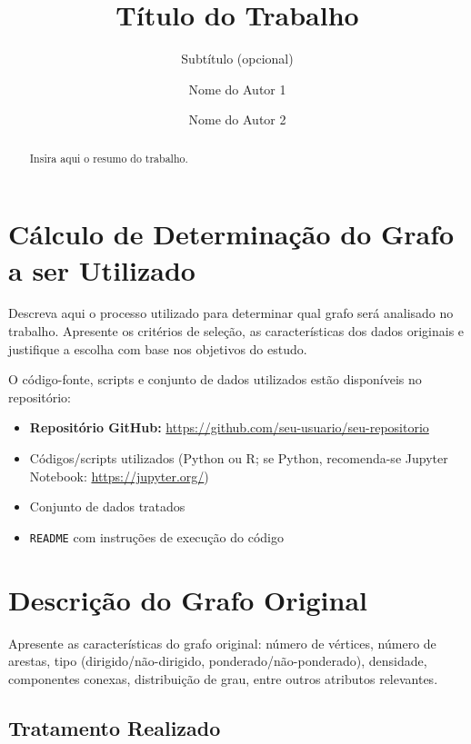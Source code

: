 \documentclass[sigconf]{webmedia}
\author{Nome do Autor 1}
\affiliation{%
  \institution{Nome da Instituição}
  \city{Cidade}
  \state{}
  \country{Brasil}
}
\author{Nome do Autor 2}
\affiliation{%
  \institution{Nome da Instituição}
  \city{Cidade}
  \state{}
  \country{Brasil}
}
\title{Título do Trabalho}
\subtitle{Subtítulo (opcional)}
\providecommand{\tightlist}{%
  \setlength{\itemsep}{0pt}\setlength{\parskip}{0pt}}
\begin{document}
\maketitle

\begin{abstract}
Insira aqui o resumo do trabalho.
\end{abstract}



\section{Cálculo de Determinação do Grafo a ser
Utilizado}\label{cuxe1lculo-de-determinauxe7uxe3o-do-grafo-a-ser-utilizado}

Descreva aqui o processo utilizado para determinar qual grafo será
analisado no trabalho. Apresente os critérios de seleção, as
características dos dados originais e justifique a escolha com base nos
objetivos do estudo.

O código-fonte, scripts e conjunto de dados utilizados estão disponíveis
no repositório:

\begin{itemize}
\tightlist
\item
  \textbf{Repositório GitHub:}
  \url{https://github.com/seu-usuario/seu-repositorio}
\item
  Códigos/scripts utilizados (Python ou R; se Python, recomenda-se
  Jupyter Notebook: \url{https://jupyter.org/})
\item
  Conjunto de dados tratados
\item
  \texttt{README} com instruções de execução do código
\end{itemize}

\section{Descrição do Grafo
Original}\label{descriuxe7uxe3o-do-grafo-original}

Apresente as características do grafo original: número de vértices,
número de arestas, tipo (dirigido/não-dirigido,
ponderado/não-ponderado), densidade, componentes conexas, distribuição
de grau, entre outros atributos relevantes.

\subsection{Tratamento Realizado}\label{tratamento-realizado}
\end{document}
